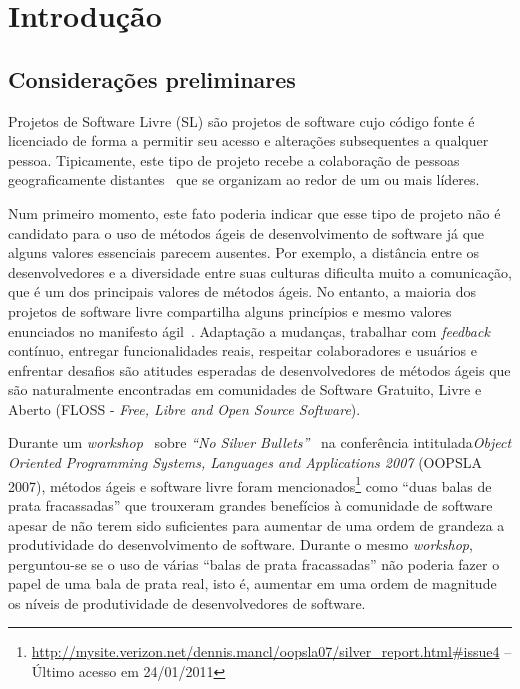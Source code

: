 \chapter{Introdução}
\label{cap:introducao}

\section{Considerações preliminares}
\label{sec:consideracoes_preliminares}

Projetos de Software Livre (SL) são projetos de software cujo código
fonte é licenciado de forma a permitir seu acesso e alterações
subsequentes a qualquer pessoa. Tipicamente, este tipo de projeto
recebe a colaboração de pessoas geograficamente
distantes~\cite{Dempsey1999} que se organizam ao redor de um ou mais
líderes.

Num primeiro momento, este fato poderia indicar que esse tipo de
projeto não é candidato para o uso de métodos ágeis de desenvolvimento
de software já que alguns valores essenciais parecem ausentes. Por
exemplo, a distância entre os desenvolvedores e a diversidade entre
suas culturas dificulta muito a comunicação, que é um dos principais
valores de métodos ágeis. No entanto, a maioria dos projetos de
software livre compartilha alguns princípios e mesmo valores
enunciados no manifesto ágil~\cite{AgileManifesto}. Adaptação a
mudanças, trabalhar com \emph{feedback} contínuo, entregar
funcionalidades reais, respeitar colaboradores e usuários e enfrentar
desafios são atitudes esperadas de desenvolvedores de métodos ágeis
que são naturalmente encontradas em comunidades de Software Gratuito,
Livre e Aberto (FLOSS - \emph{Free, Libre and Open Source Software}).

Durante um \emph{workshop}~\cite{OOPSLA07} sobre \emph{``No Silver
  Bullets''}~\cite{Brooks1987} na conferência intitulada\emph{Object
  Oriented Programming Systems, Languages and Applications 2007}
(OOPSLA 2007), métodos ágeis e software livre foram
mencionados\footnote{\url{http://mysite.verizon.net/dennis.mancl/oopsla07/silver_report.html\#issue4}
  -- Último acesso em 24/01/2011} como ``duas balas de prata
fracassadas'' que trouxeram grandes benefícios à comunidade de
software apesar de não terem sido suficientes para aumentar de uma
ordem de grandeza a produtividade do desenvolvimento de
software. Durante o mesmo \emph{workshop}, perguntou-se se o uso de
várias ``balas de prata fracassadas'' não poderia fazer o papel de uma
bala de prata real, isto é, aumentar em uma ordem de magnitude os
níveis de produtividade de desenvolvedores de software.

